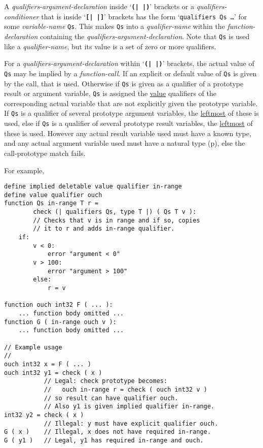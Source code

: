 \documentclass[12pt]{article}
\newcommand{\TT}[1]{{\tt \bfseries #1}}
\newcommand{\pagref}[1]{p\pageref{#1}}
\newenvironment{indpar}[1][0.3in]%
	{\begin{list}{}%
		     {\setlength{\itemsep}{0in}%
		      \setlength{\topsep}{0in}%
		      \setlength{\parsep}{1ex}%
		      \setlength{\labelwidth}{#1}%
		      \setlength{\leftmargin}{#1}%
		      \addtolength{\leftmargin}{\labelsep}}%
	 \item}%
	{\end{list}}
\begin{document}
A {\em qualifiers-argument-declaration}
\label{QUALIFIERS-ARGUMENT-DECLARATION-DISCUSSION}
inside `\TT{(|\,|)}' brackets or
a {\em qualifiers-conditioner} that is inside `\TT{[|\,|]}' brackets has the
form `{\tt qualifiers Qs \ldots}' for some {\em variable-name} {\tt Qs}.
This makes {\tt Qs} into a {\em qualifier-name}
within the {\em function-de\-clar\-a\-tion}
containing the {\em qualifiers-argument-de\-clar\-a\-tion}.  Note that {\tt Qs}
is used like a {\em qualifier-name}, but its value is a set of
zero or more qualifiers.

For a {\em qualifiers-argument-declaration}
within `\TT{(|\,|)}' brackets,
the actual value of {\tt Qs} may be implied by a {\em function-call}.
If an explicit or default value of {\tt Qs} is given by the call, that is used.
Otherwise if {\tt Qs} is given as a qualifier
of a prototype result or argument variable,
{\tt Qs} is assigned the \underline{value} qualifiers of the
corresponding actual variable that are not explicitly given the
prototype variable.  If {\tt Qs} is a qualifier of several prototype
argument variables, the \underline{leftmost} of these
is used, else if {\tt Qs} is a qualifier of several prototype result
variables, the \underline{leftmost} of these is used.
However any actual result variable used must have
a known type, and any actual argument variable used must have
a natural type (\pagref{NATURAL-TYPE}), else the call-prototype match
fails.

For example,
\begin{indpar}\begin{verbatim}
define implied deletable value qualifier in-range
define value qualifier ouch
function Qs in-range T r =
        check (| qualifiers Qs, type T |) ( Qs T v ):
        // Checks that v is in range and if so, copies
        // it to r and adds in-range qualifier.
    if:
        v < 0:
            error "argument < 0"
        v > 100:
            error "argument > 100"
        else:
            r = v

function ouch int32 F ( ... ):
    ... function body omitted ...
function G ( in-range ouch v ):
    ... function body omitted ...

// Example usage
//
ouch int32 x = F ( ... )
ouch int32 y1 = check ( x )
           // Legal: check prototype becomes:
           //   ouch in-range r = check ( ouch int32 v )
           // so result can have qualifier ouch.
           // Also y1 is given implied qualifier in-range.
int32 y2 = check ( x )
           // Illegal: y must have explicit qualifier ouch.
G ( x )    // Illegal, x does not have required in-range.
G ( y1 )   // Legal, y1 has required in-range and ouch.
\end{verbatim}\end{indpar}
\end{document}
